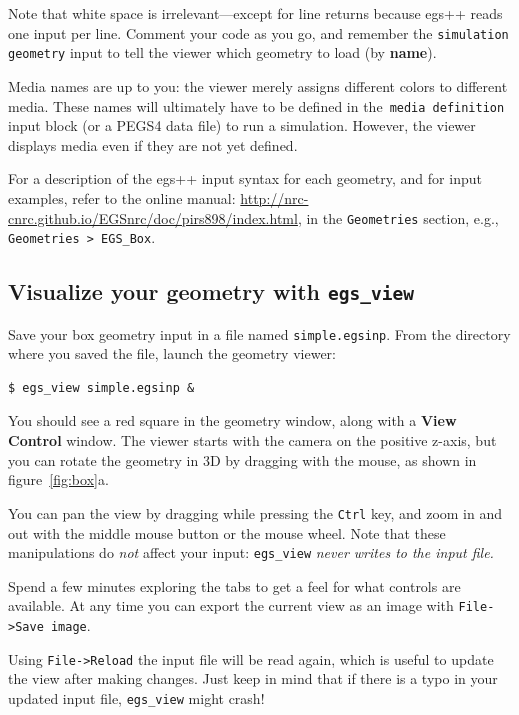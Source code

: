 \documentclass[12pt,twoside]{article}
\begin{document}
Note that white space is irrelevant---except for line returns because egs++
reads one input per line. Comment your code as you go, and remember the
\Verb|simulation geometry| input to tell the viewer which geometry to load (by
\textbf{name}).

Media names are up to you: the viewer merely assigns different colors to
different media. These names will ultimately have to be defined in the
\,\Verb|media definition|\, input block (or a PEGS4 data file) to run a simulation.
However, the viewer displays media even if they are not yet defined.

For a description of the egs++ input syntax for each geometry, and for input
examples, refer to the online manual:
\href{http://nrc-cnrc.github.io/EGSnrc/doc/pirs898/index.html}{http://nrc-cnrc.github.io/EGSnrc/doc/pirs898/index.html}, in the
\Verb|Geometries| section, e.g., \Verb|Geometries > EGS_Box|.

\vspace{1ex}
\subsection{Visualize your geometry with {\tt egs\_view}}
\label{sec:box}

Save your box geometry input in a file named \Verb|simple.egsinp|. From the
directory where you saved the file, launch the geometry viewer:

\begin{lstlisting}
$ egs_view simple.egsinp &
\end{lstlisting}

You should see a red square in the geometry window, along with a \textbf{View
Control} window. The viewer starts with the camera on the positive
z-axis, but you can rotate the geometry in 3D by dragging with the mouse, as
shown in figure~\ref{fig:box}a.

You can pan the view by dragging while pressing the \Verb|Ctrl| key, and zoom in
and out with the middle mouse button or the mouse wheel. Note that these
manipulations do \textit{not} affect your input: \Verb|egs_view| \textit{never
writes to the input file.}

Spend a few minutes exploring the tabs to get a feel for what controls are available.
At any time you can
export the current view as an image with \Verb+File->Save image+.

Using \Verb+File->Reload+ the input file will be read again, which is useful to update
the view after making changes. Just keep in mind that if there is a typo in your updated input file, \Verb|egs_view| might crash!
\end{document}
